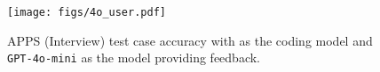 \begin{figure}[t]
    \texttt{[image: figs/4o\_user.pdf]}
    \caption{
        APPS (Interview) test case accuracy with \sonnet{} as the coding model and \texttt{GPT-4o-mini} as the \user{} model providing feedback. 
    }
    \vspace{-5pt}
    
    \label{fig:4o_user_w_sonnet_apps}
\end{figure}
